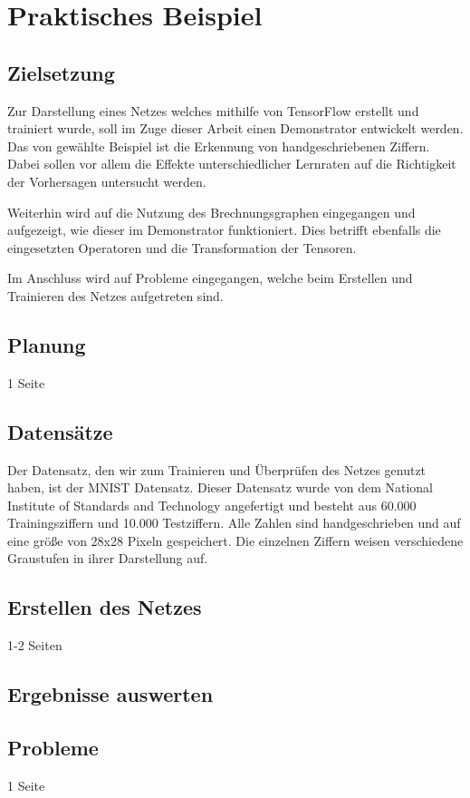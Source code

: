 \chapter{Praktisches Beispiel}
\label{chap:praktischesBeispiel}
\section{Zielsetzung}
\label{sec:zielsetzung}
\printsubchapterauthor{\authorMarco}
Zur Darstellung eines Netzes welches mithilfe von TensorFlow erstellt und trainiert wurde, soll im Zuge dieser Arbeit einen Demonstrator entwickelt werden. Das von gewählte Beispiel ist die Erkennung von handgeschriebenen Ziffern. Dabei sollen vor allem die Effekte unterschiedlicher Lernraten auf die Richtigkeit der Vorhersagen untersucht werden.

Weiterhin wird auf die Nutzung des Brechnungsgraphen eingegangen und aufgezeigt, wie dieser im Demonstrator funktioniert. Dies betrifft ebenfalls die eingesetzten Operatoren und die Transformation der Tensoren.

Im Anschluss wird auf Probleme eingegangen, welche beim Erstellen und Trainieren des Netzes aufgetreten sind.

\section{Planung}
\label{sec:planung}
\printsubchapterauthor{\authorNiklas}
1 Seite

\section{Datensätze}
\label{sec:datensaetze}
\printsubchapterauthor{\authorMarco}
Der Datensatz, den wir zum Trainieren und Überprüfen des Netzes genutzt haben, ist der MNIST Datensatz. Dieser Datensatz wurde von dem National Institute of Standards and Technology angefertigt und besteht aus 60.000 Trainingsziffern und 10.000 Testziffern. Alle Zahlen sind handgeschrieben und auf eine größe von 28x28 Pixeln gespeichert. Die einzelnen Ziffern weisen verschiedene Graustufen in ihrer Darstellung auf.

\section{Erstellen des Netzes}
\label{sec:erstellenDesNetzes}
\printsubchapterauthor{\authorNiklas}
1-2 Seiten

\section{Ergebnisse auswerten}
\label{sec:ergebnisseAuswerten}
\printsubchapterauthor{\authorMarco}

\section{Probleme}
\label{sec:probleme}
\printsubchapterauthor{\authorNiklas}
1 Seite